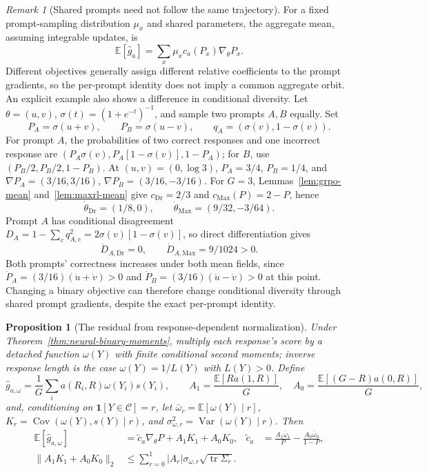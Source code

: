 \documentclass{article}
\newcommand{\enforcehalffinalproseline}{%
  \setlength{\parfillskip}{0pt plus .20\linewidth}}
\newcommand{\1}{\mathbf 1}
\newcommand{\E}{\mathbb E}
\newtheorem{proposition}[lemma]{Proposition}
\theoremstyle{remark}
\newtheorem{remark}[lemma]{Remark}
\theoremstyle{definition}
\theoremstyle{plain}
\begin{document}
\begin{remark}[Shared prompts need not follow the same trajectory]
\label{rem:neural-binary-shared-prompts}
For a fixed prompt-sampling distribution $\mu_x$ and shared parameters,
the aggregate mean, assuming integrable updates, is
\begin{equation}
 \E[\widehat g_a]
 =\sum_x\mu_x c_a(P_x)\nabla_\theta P_x.
 \label{eq:neural-binary-prompt-sum}
\end{equation}
Different objectives generally assign different relative coefficients to
the prompt gradients, so the per-prompt identity does not imply a common
aggregate orbit. An explicit example also shows a difference in conditional
diversity. Let $\theta=(u,v)$, $\sigma(t)=(1+e^{-t})^{-1}$, and sample two
prompts $A,B$ equally. Set
\[
 P_A=\sigma(u+v),\qquad P_B=\sigma(u-v),\qquad
 q_A=(\sigma(v),1-\sigma(v)).
\]
For prompt $A$, the probabilities of two correct responses and one incorrect
response are $(P_A\sigma(v),P_A[1-\sigma(v)],1-P_A)$; for $B$, use
$(P_B/2,P_B/2,1-P_B)$. At $(u,v)=(0,\log3)$,
$P_A=3/4$, $P_B=1/4$, and
$\nabla P_A=(3/16,3/16)$, $\nabla P_B=(3/16,-3/16)$.
For $G=3$, Lemmas~\ref{lem:grpo-mean} and~\ref{lem:maxrl-mean} give
$c_{\mathrm{Dr}}=2/3$ and $c_{\mathrm{Max}}(P)=2-P$, hence
\[
 \dot\theta_{\mathrm{Dr}}=(1/8,0),\qquad
 \dot\theta_{\mathrm{Max}}=(9/32,-3/64).
\]
Prompt $A$ has conditional disagreement
$D_A=1-\sum_cq_{A,c}^2=2\sigma(v)[1-\sigma(v)]$, so direct
differentiation gives
\[
 \dot D_{A,\mathrm{Dr}}=0,\qquad
 \dot D_{A,\mathrm{Max}}=9/1024>0.
\]
Both prompts' correctness increases under both mean fields, since
$\dot P_A=(3/16)(\dot u+\dot v)>0$ and
$\dot P_B=(3/16)(\dot u-\dot v)>0$ at this point. Changing a binary
objective can therefore change conditional diversity through shared prompt
gradients, despite the exact per-prompt identity.
\end{remark}

\begin{proposition}[The residual from response-dependent normalization]
\enforcehalffinalproseline
\label{prop:neural-binary-length-residual}
Under Theorem~\ref{thm:neural-binary-moments}, multiply each response's score
by a detached function $\omega(Y)$ with finite conditional second moments;
inverse response length is the case $\omega(Y)=1/L(Y)$ with $L(Y)>0$. Define
\[
 \widehat g_{a,\omega}
 =\frac1G\sum_i a(R_i,R)\omega(Y_i)s(Y_i),\qquad
 A_1=\frac{\E[R a(1,R)]}{G},\quad
 A_0=\frac{\E[(G-R)a(0,R)]}{G},
\]
and, conditioning on $\1[Y\in\mathcal C]=r$, let
$\bar\omega_r=\E[\omega(Y)\mid r]$,
$K_r=\operatorname{Cov}(\omega(Y),s(Y)\mid r)$, and
$\sigma_{\omega,r}^2=\operatorname{Var}(\omega(Y)\mid r)$.
Then
\begin{align}
 \E[\widehat g_{a,\omega}]
 &=\widetilde c_a\nabla_\theta P+A_1K_1+A_0K_0,
 &\widetilde c_a&=\frac{A_1\bar\omega_1}{P}
                  -\frac{A_0\bar\omega_0}{1-P},
 \label{eq:neural-binary-length-residual}\\
 \|A_1K_1+A_0K_0\|_2
 &\le\sum_{r=0}^1|A_r|\sigma_{\omega,r}
                 \sqrt{\operatorname{tr}\Sigma_r}.
 \label{eq:neural-binary-length-bound}
\end{align}
\end{proposition}
\end{document}
